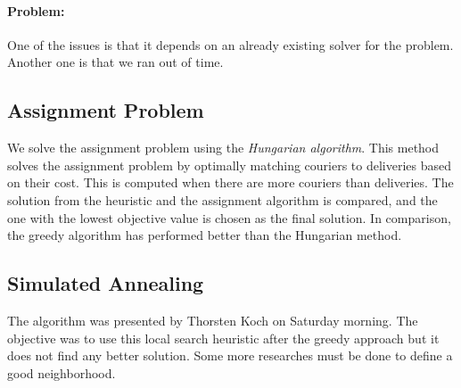 \documentclass[a4paper]{article}
\begin{document}
\paragraph{Problem:} One of the issues is that it depends on an already existing solver for the problem.
Another one is that we ran out of time.

\subsection{Assignment Problem}
We solve the assignment problem using the \emph{Hungarian algorithm}.
This method solves the assignment problem by optimally matching couriers to deliveries based on their cost.
This is computed when there are more couriers than deliveries. The solution from the heuristic and the assignment algorithm is compared, and the one with the lowest objective value is chosen as the final solution.
In comparison, the greedy algorithm has performed better than the Hungarian method.

\subsection{Simulated Annealing}
The algorithm was presented by Thorsten Koch on Saturday morning. The objective was to use this local search heuristic after the greedy approach but it does not find any better solution. Some more researches must be done to define a good neighborhood.
\end{document}
